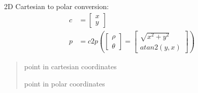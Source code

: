 \documentclass[letterpaper,10pt,english]{sphinxmanual}
\begin{document}
\begin{fulllineitems}
\label{\detokenize{conversions:conversions.c2p}}
\pysigstartsignatures
{}
\pysigstopsignatures
\sphinxAtStartPar
2D Cartesian to polar conversion:
\begin{equation}\label{equation:conversions:eq-c2p}
\begin{split}c &= \begin{bmatrix} x \\ y \end{bmatrix} \\
p & = c2p\left(\begin{bmatrix} \rho \\ \theta \end{bmatrix} = \begin{bmatrix} \sqrt{x^2+y^2} \\ atan2(y,x) \end{bmatrix}\right)\end{split}
\end{equation}\begin{quote}\begin{description}
\sphinxAtStartPar
{} \textendash{} point in cartesian coordinates

\sphinxAtStartPar
point in polar coordinates

\end{description}\end{quote}

\end{fulllineitems}

\end{document}
